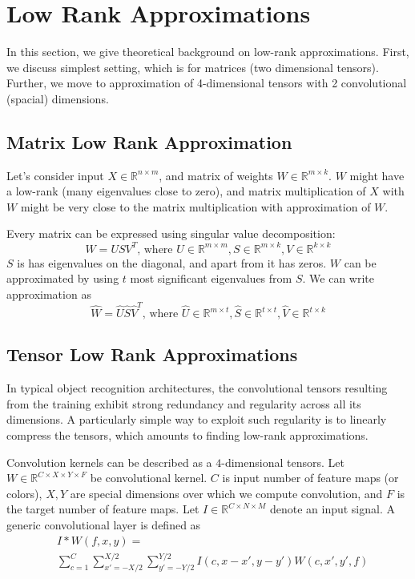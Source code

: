 \documentclass{article}
\begin{document}
\section{Low Rank Approximations}
In this section, we give theoretical background on low-rank approximations. First, we discuss simplest setting, which is
for matrices (two dimensional tensors). Further, we move to approximation of 4-dimensional tensors with 2 convolutional (spacial)
dimensions.


\subsection{Matrix Low Rank Approximation}
Let's consider input $X \in \mathbb{R}^{n \times m}$, and matrix of weights $W \in \mathbb{R}^{m \times k}$.
$W$ might have a low-rank (many eigenvalues close to zero), and matrix multiplication of $X$ with $W$ might be 
very close to the matrix multiplication with approximation of $W$. 


Every matrix can be expressed using singular value decomposition:
\begin{equation*}
	W = USV^T\text{, where }U \in \mathbb{R}^{m \times m}, S \in \mathbb{R}^{m \times k}, V \in \mathbb{R}^{k \times k}
\end{equation*}
$S$ is has eigenvalues on the diagonal, and apart from it has zeros. $W$ can be approximated by using $t$ most significant
eigenvalues from $S$. We can write approximation as
\begin{equation*}
	\hat{W} = \hat{U}\hat{S}\hat{V}^T\text{, where }\hat{U} \in \mathbb{R}^{m \times t}, \hat{S} \in \mathbb{R}^{t \times t}, \hat{V} \in \mathbb{R}^{t \times k}
\end{equation*}

\subsection{Tensor Low Rank Approximations}

In typical object recognition architectures, the convolutional tensors resulting
from the training exhibit strong redundancy and regularity across all its 
dimensions. A particularly simple way to exploit such regularity is to 
linearly compress the tensors, which amounts to finding low-rank 
approximations.

Convolution kernels can be described as a $4$-dimensional tensors. Let $W \in \mathbb{R}^{C \times X \times Y \times F}$ 
be convolutional kernel. 
$C$ is input number of feature maps (or colors), $X, Y$ are special dimensions
over which we compute convolution, and $F$ is the target number of feature maps.
Let $I \in \mathbb{R}^{C \times N \times M}$ denote an input signal.
A generic convolutional layer is defined as
\begin{align*}
\label{convlayereq}
&I \ast W (f,x,y) = \\
&\sum_{c=1}^C \sum_{x'=-X/2}^{X/2} \sum_{y'=-Y/2}^{Y/2} I(c,x-x',y-y') W(c,x',y',f)
\end{align*}
\end{document}
